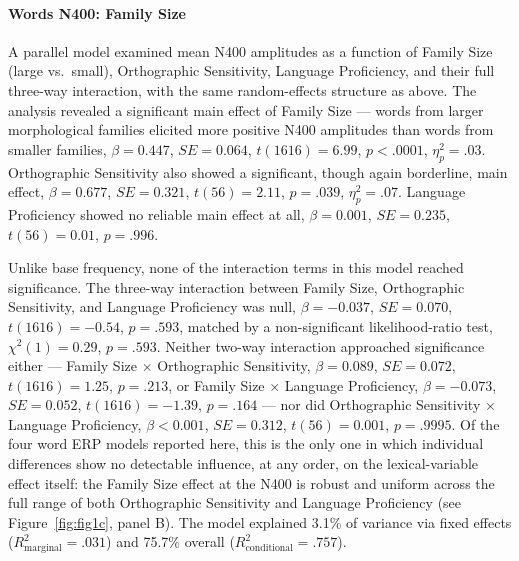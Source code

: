 \documentclass[utf8]{FrontiersinHarvard} %
\begin{document}
	\paragraph*{Words N400: Family Size}

	A parallel model examined mean N400 amplitudes as a function of Family Size (large vs.\ small), Orthographic Sensitivity, Language Proficiency, and their full three-way interaction, with the same random-effects structure as above. The analysis revealed a significant main effect of Family Size --- words from larger morphological families elicited more positive N400 amplitudes than words from smaller families, $\beta = 0.447$, $SE = 0.064$, $t(1616) = 6.99$, $p < .0001$, $\eta^2_p = .03$. Orthographic Sensitivity also showed a significant, though again borderline, main effect, $\beta = 0.677$, $SE = 0.321$, $t(56) = 2.11$, $p = .039$, $\eta^2_p = .07$. Language Proficiency showed no reliable main effect at all, $\beta = 0.001$, $SE = 0.235$, $t(56) = 0.01$, $p = .996$.

	Unlike base frequency, none of the interaction terms in this model reached significance. The three-way interaction between Family Size, Orthographic Sensitivity, and Language Proficiency was null, $\beta = -0.037$, $SE = 0.070$, $t(1616) = -0.54$, $p = .593$, matched by a non-significant likelihood-ratio test, $\chi^2(1) = 0.29$, $p = .593$. Neither two-way interaction approached significance either --- Family Size $\times$ Orthographic Sensitivity, $\beta = 0.089$, $SE = 0.072$, $t(1616) = 1.25$, $p = .213$, or Family Size $\times$ Language Proficiency, $\beta = -0.073$, $SE = 0.052$, $t(1616) = -1.39$, $p = .164$ --- nor did Orthographic Sensitivity $\times$ Language Proficiency, $\beta < 0.001$, $SE = 0.312$, $t(56) = 0.001$, $p = .9995$. Of the four word ERP models reported here, this is the only one in which individual differences show no detectable influence, at any order, on the lexical-variable effect itself: the Family Size effect at the N400 is robust and uniform across the full range of both Orthographic Sensitivity and Language Proficiency (see Figure~\ref{fig:fig1c}, panel B). The model explained 3.1\% of variance via fixed effects ($R^2_{\mathrm{marginal}} = .031$) and 75.7\% overall ($R^2_{\mathrm{conditional}} = .757$).
\end{document}
